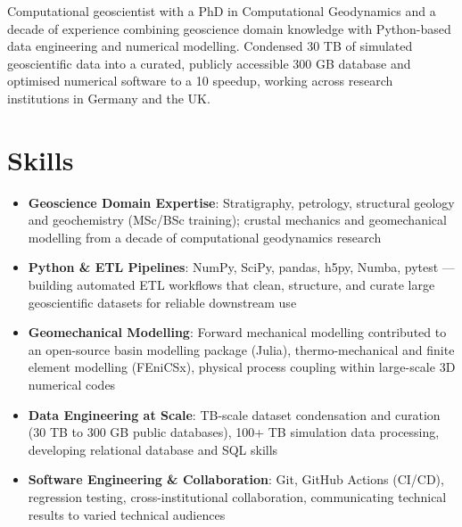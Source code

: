 \documentclass[11pt,a4paper,sans]{moderncv}
\begin{document}
\makecvtitle


\vspace{6pt}
\small{Computational geoscientist with a PhD in Computational Geodynamics and a decade of experience combining geoscience domain knowledge with Python-based data engineering and numerical modelling. Condensed 30 TB of simulated geoscientific data into a curated, publicly accessible 300 GB database and optimised numerical software to a 10\texttimes{} speedup, working across research institutions in Germany and the UK.}


\section{Skills}
\vspace{1pt}
\begin{itemize}

\item \textbf{Geoscience Domain Expertise}: Stratigraphy, petrology, structural geology and geochemistry (MSc/BSc training); crustal mechanics and geomechanical modelling from a decade of computational geodynamics research

\item \textbf{Python \& ETL Pipelines}: NumPy, SciPy, pandas, h5py, Numba, pytest — building automated ETL workflows that clean, structure, and curate large geoscientific datasets for reliable downstream use

\item \textbf{Geomechanical Modelling}: Forward mechanical modelling contributed to an open-source basin modelling package (Julia), thermo-mechanical and finite element modelling (FEniCSx), physical process coupling within large-scale 3D numerical codes

\item \textbf{Data Engineering at Scale}: TB-scale dataset condensation and curation (30 TB to 300 GB public databases), 100+ TB simulation data processing, developing relational database and SQL skills

\item \textbf{Software Engineering \& Collaboration}: Git, GitHub Actions (CI/CD), regression testing, cross-institutional collaboration, communicating technical results to varied technical audiences

\end{itemize}
\end{document}
